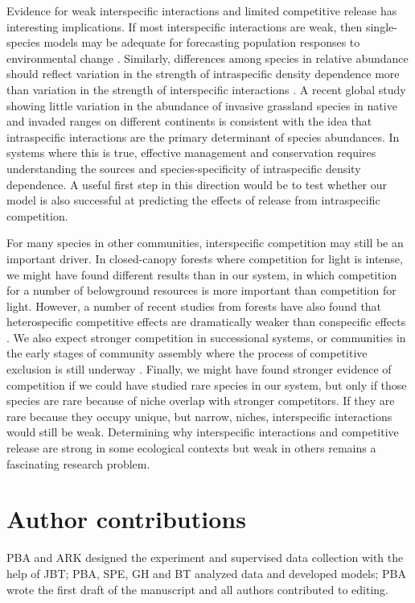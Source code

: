 \documentclass[11pt]{article}
\begin{document}
\begin{doublespacing}
Evidence for weak interspecific interactions and limited competitive release has interesting implications. If most 
interspecific interactions are weak, then single-species models may be adequate for forecasting population responses 
to environmental change \citep{adler_forecasting_2012,kleinhesselink_indirect_2015,Chu2016}. Similarly, differences among 
species in relative abundance should reflect variation in the strength of intraspecific density dependence more than 
variation in the strength of interspecific interactions \citep{yenni_strong_2012}. A recent global study showing little 
variation in the abundance of invasive grassland species in native and invaded ranges on different 
continents  \citep{firn_abundance_2011} is consistent with the idea that intraspecific interactions are the primary determinant 
of species abundances. In systems where this is true, effective management and conservation requires understanding the sources 
and species-specificity of intraspecific density dependence. A useful first step in this direction would be to test 
whether our model is also successful at predicting the effects of release from intraspecific competition.

For many species in other communities, interspecific competition may still be an important driver. In closed-canopy 
forests where competition for light is intense, we might have found different results than in our system, in which 
competition for a number of belowground resources is more important than competition for light. However, a 
number of recent studies from forests have also found that heterospecific competitive effects are dramatically 
weaker than conspecific effects \citep{comita_asymmetric_2010,Kunstler2016,johnson_conspecific_2012}.  We also 
expect stronger competition in successional systems, or communities in the early stages of community assembly 
where the process of competitive exclusion is still underway \citep{kokkoris_patterns_1999}. Finally, we might have
found stronger evidence of competition if we could have studied rare species in our system, but only if those species 
are rare because of niche overlap with stronger competitors. If they are rare because they occupy unique, but narrow, niches, 
interspecific interactions would still be weak. Determining why interspecific interactions and competitive release are 
strong in some ecological contexts but weak in others remains a fascinating research problem. 

\section*{Author contributions}
PBA and ARK designed the experiment and supervised data collection with the help of JBT; PBA, SPE, GH and BT analyzed data and 
developed models; PBA wrote the first draft of the manuscript and all authors contributed to editing.


\end{doublespacing}
\end{document}
